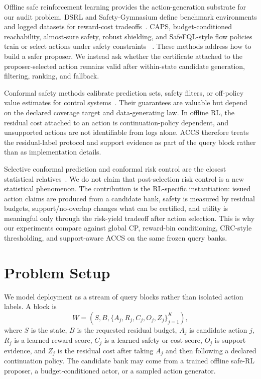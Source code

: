 \documentclass[letterpaper]{article}
\begin{document}
Offline safe reinforcement learning provides the action-generation substrate for
our audit problem. DSRL and Safety-Gymnasium define benchmark environments and
logged datasets for reward-cost tradeoffs~\cite{liu2023dsrl,ji2023safetygymnasium}.
CAPS, budget-conditioned reachability, almost-sure safety, robust shielding, and
SafeFQL-style flow policies train or select actions under safety constraints
~\cite{li2025caps,wang2026bcrl,aegis2026,robustshield2026,tayal2026safefql}.
These methods address how to build a safer proposer. We instead ask whether the
certificate attached to the proposer-selected action remains valid after
within-state candidate generation, filtering, ranking, and fallback.

Conformal safety methods calibrate prediction sets, safety filters, or
off-policy value estimates for control systems~\cite{selig2023conformalfilter,
conformalsafetyshielding2025,foffano2023conformalOPE}. Their guarantees are
valuable but depend on the declared coverage target and data-generating law. In
offline RL, the residual cost attached to an action is continuation-policy
dependent, and unsupported actions are not identifiable from logs alone. ACCS
therefore treats the residual-label protocol and support evidence as part of
the query block rather than as implementation details.

Selective conformal prediction and conformal risk control are the closest
statistical relatives~\cite{bao2025cap,angelopoulos2025crc}. We do not claim
that post-selection risk control is a new statistical phenomenon. The
contribution is the RL-specific instantiation: issued action claims are produced
from a candidate bank, safety is measured by residual budgets, support/no-overlap
changes what can be certified, and utility is meaningful only through the
risk-yield tradeoff after action selection. This is why our experiments compare
against global CP, reward-bin conditioning, CRC-style thresholding, and
support-aware ACCS on the same frozen query banks.

\section{Problem Setup}

We model deployment as a stream of query blocks rather than isolated action
labels. A block is
\[
W = (S, B, \{A_j, R_j, C_j, O_j, Z_j\}_{j=1}^K),
\]
where $S$ is the state, $B$ is the requested residual budget, $A_j$ is candidate
action $j$, $R_j$ is a learned reward score, $C_j$ is a learned safety or cost
score, $O_j$ is support evidence, and $Z_j$ is the residual cost after taking
$A_j$ and then following a declared continuation policy. The candidate bank may
come from a trained offline safe-RL proposer, a budget-conditioned actor, or a
sampled action generator.
\end{document}
